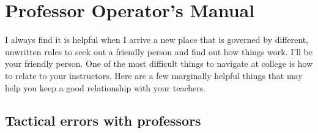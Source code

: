 
\chapter{Professor Operator's Manual} 

I always find it is helpful when I arrive a new place that is governed by different, unwritten rules to seek out a friendly person and find out how things work. I’ll be your friendly person. One of the most difficult things to navigate at college is how to relate to your instructors. Here are a few marginally helpful things that may help you keep a good relationship with your teachers.

\section{Tactical errors with professors}

